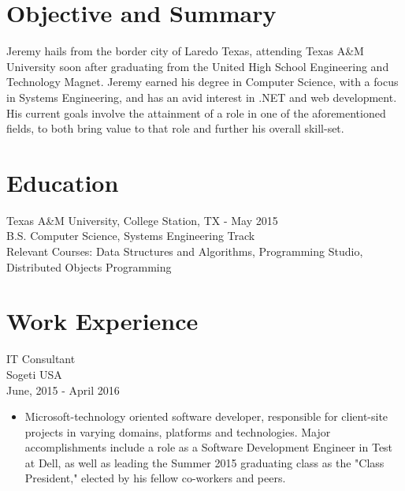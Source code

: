 \documentclass[11pt]{res} %
\begin{document}
 
 

\address{{\bf Current Address} \\   11011 Domain Drive \\   Austin, TX
         78758   \\ (956)286-8386}
\address{{\bf Contact Information} \\ jeremycantu.com \\ github.com/jac21 \\ mail@jeremycantu.com}
 
                                             
\begin{resume}
                                               
 
\section{Objective and Summary}
   Jeremy hails from the border city of Laredo Texas, attending Texas A\&M University soon after graduating from the United High School Engineering and Technology Magnet. Jeremy earned his degree in Computer Science, with a focus in Systems Engineering, and has an avid interest in .NET and web development. His current goals involve the attainment of a role in one of the aforementioned fields, to both bring value to that role and further his overall skill-set.
 
\section{Education} 
 \noindent Texas A\&M University, College Station, TX - May 2015 \\
B.S. Computer Science, Systems Engineering Track \\
Relevant Courses: Data Structures and Algorithms, Programming Studio, Distributed Objects Programming
 
\section{Work Experience} 
 IT Consultant \\
Sogeti USA \\
June, 2015 - April 2016 
\vspace{0.2in}
   \begin{itemize} \itemsep -2pt  %
   \item Microsoft-technology oriented software developer, responsible for client-site projects in varying domains, platforms and technologies. Major accomplishments include a role as a Software Development Engineer in Test at Dell, as well as leading the Summer 2015 graduating class as the "Class President," elected by his fellow co-workers and peers.
 \end{itemize}


\end{resume}
\end{document}
